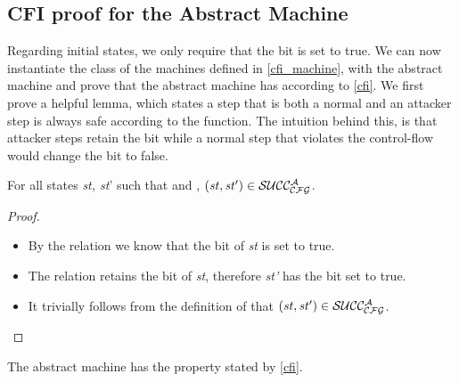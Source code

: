 \subsection{CFI proof for the Abstract Machine}\label{abstract_proof}

Regarding initial states, we only require that the \ok bit is set to
true.  We can now instantiate the class of the machines defined in
\cref{cfi_machine}, with the abstract machine and prove that the
abstract machine has \CFI according to \cref{cfi}.  We first prove a
helpful lemma, which states a step that is both a normal and an
attacker step is always safe according to the  function. The
intuition behind this, is that attacker steps retain the \ok bit while
a normal step that violates the control-flow would change the \ok bit
to false.

\begin{lemma}
\label{attacker_no_v}
For all states \textit{st, st}' such that 
and , $(\mathit{st},\mathit{st'}) \in \mathcal{SUCC_\mathcal{CFG}^{A}}$.
\end{lemma}

\begin{proof}
~
\begin{itemize}
\item By the relation  we know that the \ok bit
of \textit{st} is set to true.
\item The relation  retains the \ok bit of
\textit{st}, therefore \textit{st'} has the \ok bit set to true.
\item It trivially follows from the definition of  that
$(\mathit{st},\mathit{st'}) \in \mathcal{SUCC_\mathcal{CFG}^{A}}$.
\end{itemize}
\end{proof}

\begin{theorem}\label{CFIabstract}
The abstract machine has the \CFI property stated by \cref{cfi}.
\end{theorem}

